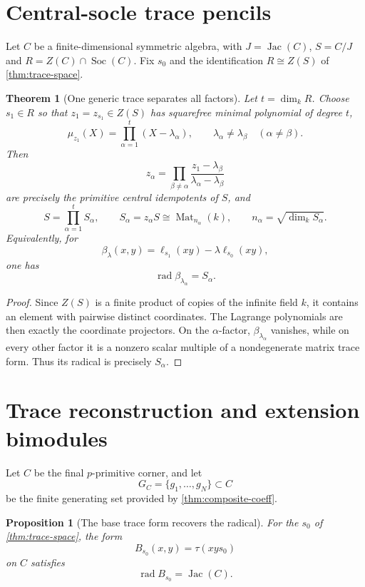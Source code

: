 \documentclass[11pt,reqno]{amsart}
\newtheorem{theorem}{Theorem}[section]
\newtheorem{proposition}[proposition]{Proposition}
\theoremstyle{definition}
\theoremstyle{remark}
\theoremstyle{definition}
\newcommand{\Mat}{\operatorname{Mat}}
\newcommand{\Jac}{\operatorname{Jac}}
\newcommand{\Soc}{\operatorname{Soc}}
\newcommand{\rad}{\operatorname{rad}}
\begin{document}
\section{Central-socle trace pencils}\label{sec:trace-pencil}

Let $C$ be a finite-dimensional symmetric algebra, with
$J=\Jac(C)$, $S=C/J$ and $R=Z(C)\cap\Soc(C)$.
Fix $s_0$ and the identification $R\cong Z(S)$ of \cref{thm:trace-space}.

\begin{theorem}[One generic trace separates all factors]\label{thm:generic-trace}
Let $t=\dim_kR$.  Choose $s_1\in R$ so that
$z_1=z_{s_1}\in Z(S)$ has squarefree minimal polynomial of degree $t$,
\[
 \mu_{z_1}(X)=\prod_{\alpha=1}^t(X-\lambda_\alpha),
 \qquad \lambda_\alpha\ne\lambda_\beta\quad(\alpha\ne\beta).
\]
Then
\[
 z_\alpha
 =\prod_{\beta\ne\alpha}
 \frac{z_1-\lambda_\beta}{\lambda_\alpha-\lambda_\beta}
\]
are precisely the primitive central idempotents of $S$, and
\[
 S=\prod_{\alpha=1}^tS_\alpha,
 \qquad
 S_\alpha=z_\alpha S\cong\Mat_{n_\alpha}(k),
 \qquad
 n_\alpha=\sqrt{\dim_kS_\alpha}.
\]
Equivalently, for
\[
 \beta_\lambda(x,y)=\ell_{s_1}(xy)-\lambda\ell_{s_0}(xy),
\]
one has
\[
 \rad\beta_{\lambda_\alpha}=S_\alpha.
\]
\end{theorem}

\begin{proof}
Since $Z(S)$ is a finite product of copies of the infinite field $k$, it
contains an element with pairwise distinct coordinates.
The Lagrange polynomials are then exactly the coordinate projectors.  On the
$\alpha$-factor, $\beta_{\lambda_\alpha}$ vanishes, while on every other
factor it is a nonzero scalar multiple of a nondegenerate matrix trace form.
Thus its radical is precisely $S_\alpha$.
\end{proof}

\section{Trace reconstruction and extension bimodules}\label{sec:extensions}

Let $C$ be the final $p$-primitive corner, and let
\[
 G_C=\{g_1,\ldots,g_N\}\subset C
\]
be the finite generating set provided by \cref{thm:composite-coeff}.

\begin{proposition}[The base trace form recovers the radical]\label{prop:recover-radical}
For the $s_0$ of \cref{thm:trace-space}, the form
\[
 B_{s_0}(x,y)=\tau(xys_0)
\]
on $C$ satisfies
\[
 \rad B_{s_0}=\Jac(C).
\]
\end{proposition}
\end{document}
